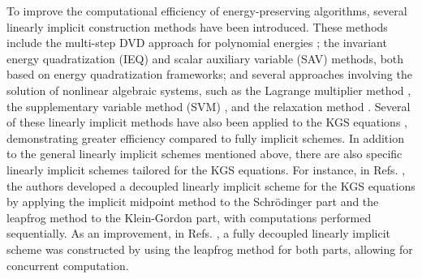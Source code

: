 \documentclass[fleqn,11pt]{elsarticle}
\numberwithin{equation}{section}
\begin{document}
To improve the computational efficiency of energy-preserving algorithms, several linearly implicit construction methods have been introduced. These methods include the multi-step DVD approach for polynomial energies \cite{matsuo2001, dahlby2011}; the invariant energy quadratization (IEQ) \cite{yang2017c, zhao2017} and scalar auxiliary variable (SAV) \cite{shen2018, shen2019a} methods, both based on energy quadratization frameworks; and several approaches involving the solution of nonlinear algebraic systems, such as the Lagrange multiplier method \cite{cheng2020}, the supplementary variable method (SVM) \cite{svm1, svm2}, and the relaxation method \cite{relaxationLi}. Several of these linearly implicit methods have also been applied to the KGS equations  \cite{fkgs_sav_mcs, kgs_sav_jsc, li2023, li2024}, demonstrating greater efficiency compared to fully implicit schemes.  In addition to the general linearly implicit schemes mentioned above, there are also specific linearly implicit schemes tailored for the KGS equations. For instance, in Refs. \cite{kgs_cifd, li2019a}, the authors developed a decoupled linearly implicit scheme for the KGS equations by applying the implicit midpoint method to the Schr\"odinger part and the leapfrog method to the Klein-Gordon part, with computations performed sequentially. As an improvement, in Refs. \cite{kgs_difd, yang2021}, a fully decoupled linearly implicit scheme was constructed by using the leapfrog method for both parts, allowing for concurrent computation.
\end{document}
